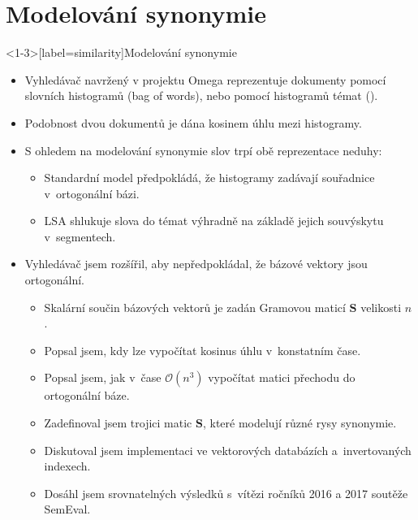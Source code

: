 \documentclass[aspectratio=169,t]{beamer}
\let\abbr\relax
\begin{document}
\section{Modelování synonymie}
\begin{frame}<1-3>[label=similarity]{Modelování synonymie}
\begin{itemize}
  \item<1-> Vyhledávač navržený v projektu Omega reprezentuje dokumenty pomocí
    \alert<1>{slovních histogramů (bag of words)}, nebo pomocí \alert<1>{histogramů
    témat (\abbr{LSA})}.
  \item<2-> \alert<2>{Podobnost} dvou dokumentů \alert<2>{je dána kosinem úhlu}
    mezi histogramy.
  \item<3-> S ohledem na modelování synonymie slov trpí obě reprezentace neduhy:
    \begin{itemize}
      \item<3-> Standardní model předpokládá, že \alert<3>{histogramy zadávají
        souřadnice v~ortogonální bázi}.
      \item<4-> LSA \alert<4>{shlukuje slova} do témat výhradně \alert<4>{na
        základě jejich souvýskytu} v~segmentech.
    \end{itemize}
  \item<5-> Vyhledávač jsem rozšířil, aby \alert<5>{nepředpokládal, že
    bázové vektory jsou ortogonální}.
    \begin{itemize}
      \item<6-> \alert<6>{Skalární součin} bázových vektorů je \alert<6>{zadán
        Gramovou maticí $\mathbf S$} velikosti $n$.
      \item<7-> Popsal jsem, kdy lze \alert<7>{vypočítat kosinus úhlu
        v~konstatním čase}.
      \item<8-> Popsal jsem, jak \alert<8>{v~čase $\mathcal O(n^3)$ vypočítat matici
        přechodu do ortogonální báze}.
      \item<9-> Zadefinoval jsem trojici matic $\mathbf S$, které
        \alert<9>{modelují různé rysy synonymie}.
      \item<10-> Diskutoval jsem \alert<10>{implementaci ve vektorových databázích
        a~invertovaných indexech}.
      \item<11-> Dosáhl jsem \alert<11>{srovnatelných výsledků s~vítězi} ročníků 2016 a
        2017 soutěže SemEval.
    \end{itemize}
\end{itemize}
\end{frame}
\end{document}
